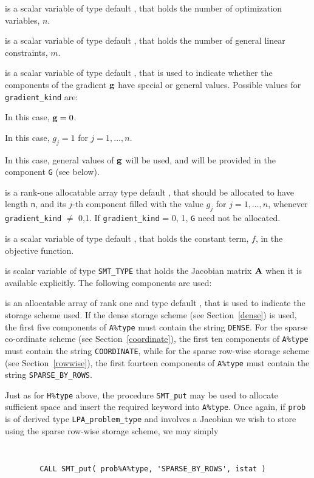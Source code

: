 \documentclass{galahad}
\newcommand{\packagename}{LPA}
\begin{document}
\begin{description}

 is a scalar variable of type default \integer,
 that holds the number of optimization variables, $n$.

 is a scalar variable of type default \integer,
 that holds the number of general linear constraints, $m$.

 is a scalar variable of type default \integer,
that is used to indicate whether the components of the gradient ${\mathbf{g}}$
have special or general values. Possible values for {\tt gradient\_kind} are:
\begin{description}
  In this case, ${\mathbf{g}} = 0$.

 In this case, $g_{j} = 1$ for $j = 1, \ldots , n$.

 In this case, general values of ${\mathbf{g}}$ will be used,
     and will be provided in the component {\tt G} (see below).
\end{description}

 is a rank-one allocatable array type default \realdp, that
should be allocated to have length {\tt n}, and its $j$-th component
filled with the value $g_{j}$ for $j = 1, \ldots , n$,
whenever {\tt gradient\_kind} $\neq$ 0,1.
If {\tt gradient\_kind} {= 0, 1}, {\tt G} need not be allocated.

 is a scalar variable of type
default \realdp, that holds
the constant term, $f$, in the objective function.

 is scalar variable of type {\tt SMT\_TYPE}
that holds the Jacobian matrix ${\mathbf{A}}$ when it is available explicitly.
The following components are used:

\begin{description}

 is an allocatable array of rank one and type default \character,
that is used to indicate the storage scheme used. If the dense storage scheme
(see Section~\ref{dense}) is used,
the first five components of {\tt A\%type} must contain the
string {\tt DENSE}.
For the sparse co-ordinate scheme (see Section~\ref{coordinate}),
the first ten components of {\tt A\%type} must contain the
string {\tt COORDINATE}, while
for the sparse row-wise storage scheme (see Section~\ref{rowwise}),
the first fourteen components of {\tt A\%type} must contain the
string {\tt SPARSE\_BY\_ROWS}.

Just as for {\tt H\%type} above, the procedure {\tt SMT\_put}
may be used to allocate sufficient space and insert the required keyword
into {\tt A\%type}.
Once again, if {\tt prob} is of derived type {\tt \packagename\_problem\_type}
and involves a Jacobian we wish to store using the sparse row-wise
storage scheme, we may simply
{\tt
\begin{verbatim}
        CALL SMT_put( prob%A%type, 'SPARSE_BY_ROWS', istat )
\end{verbatim}
}
\noindent


\end{description}
\end{description}
\end{document}
